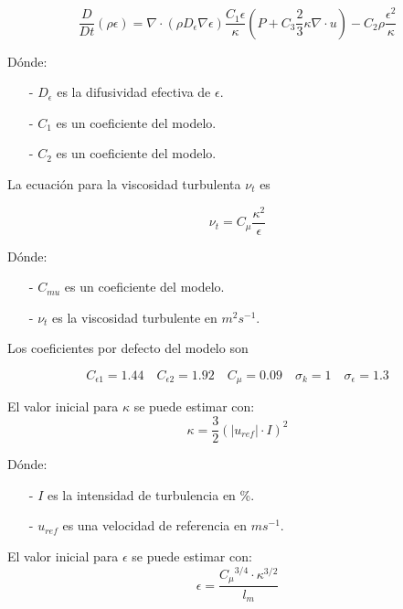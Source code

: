 \begin{equation}\label{eq:k}
  \frac{D}{Dt}(\rho \epsilon) = \nabla \cdot (\rho D_{\epsilon}\nabla \epsilon) \frac{C_{1}\epsilon}{\kappa} \left( P+C_{3}\frac{2}{3}\kappa\nabla\cdot u \right) - C_{2}\rho\frac{\epsilon^{2}}{\kappa}
\end{equation}

Dónde:
\begin{itemize}
  \item[-] $D_{\epsilon}$ es la difusividad efectiva de $\epsilon$.
  \item[-] $C_{1}$ es un coeficiente del modelo.
  \item[-] $C_{2}$ es un coeficiente del modelo.
\end{itemize}

La ecuación para la viscosidad turbulenta $\nu_{t}$ es

\begin{equation}\label{eq:nu_t}
  \nu_{t} = C_{\mu}\frac{\kappa^{2}}{\epsilon}
\end{equation}

Dónde:
\begin{itemize}
        \item[-] $C_{mu}$ es un coeficiente del modelo.
        \item[-] $\nu_{t}$ es la viscosidad turbulente en $m^{2}s^{-1}$.
\end{itemize}

Los coeficientes por defecto del modelo son

\begin{equation}
  C_{\epsilon 1}=1.44
  \quad
  C_{\epsilon 2}=1.92
  \quad
  C_{\mu}=0.09
  \quad
  \sigma_{k}=1
  \quad
  \sigma_{\epsilon}=1.3
\end{equation}

El valor inicial para $\kappa$ se puede estimar con:
\begin{equation}\label{eq:kappa_est}
  \kappa = \frac{3}{2} {\left( |u_{ref}| \cdot I \right)}^{2}
\end{equation}

Dónde:
\begin{itemize}
  \item[-] $I$ es la intensidad de turbulencia en \%.
  \item[-] $u_{ref}$ es una velocidad de referencia en $ms^{-1}$.
\end{itemize}

El valor inicial para $\epsilon$ se puede estimar con:
\begin{equation}\label{eq:epsilon_est}
  \epsilon = \frac{{C_{\mu}}^{3/4} \cdot {\kappa}^{3/2}} {l_{m}}
\end{equation}

